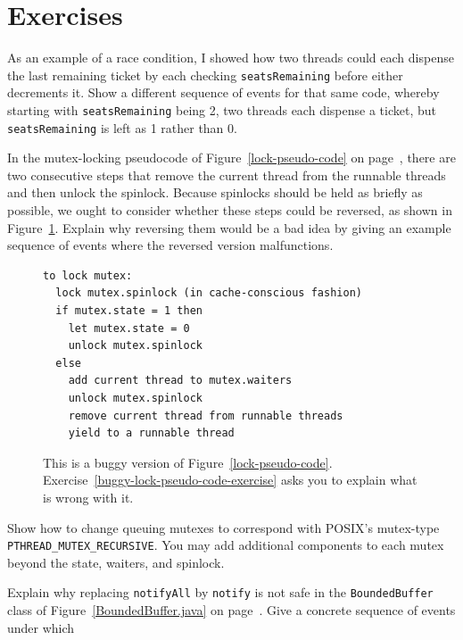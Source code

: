 \section*{Exercises}
\begin{chapterEnumerate}
\item\label{race-exercise}
As an example of a race condition, I showed how two threads could
each dispense the last remaining ticket by each checking
\verb|seatsRemaining| before either decrements it.  Show a different
sequence of events for that same code, whereby starting with
\verb|seatsRemaining| being 2, two threads each dispense a ticket, but
\verb|seatsRemaining| is left as 1 rather than 0.
\item\label{buggy-lock-pseudo-code-exercise}
In the mutex-locking pseudocode of Figure~\ref{lock-pseudo-code} on
page~\pageref{lock-pseudo-code}, there
are two consecutive steps that remove the current thread from the
runnable threads and then unlock the spinlock.  Because spinlocks should
be held as briefly as possible, we ought to consider whether these
steps could be reversed, as shown in Figure~\ref{buggy-lock-pseudo-code}.  Explain why reversing them would be a bad
idea by giving an example sequence of events where the reversed
version malfunctions.
\begin{figure}
\begin{verbatim}
to lock mutex:
  lock mutex.spinlock (in cache-conscious fashion)
  if mutex.state = 1 then
    let mutex.state = 0
    unlock mutex.spinlock
  else
    add current thread to mutex.waiters
    unlock mutex.spinlock
    remove current thread from runnable threads
    yield to a runnable thread
\end{verbatim}
\caption{This is a buggy version of Figure~\ref{lock-pseudo-code}. Exercise~\ref{buggy-lock-pseudo-code-exercise} asks you to explain what is wrong with it.}
\label{buggy-lock-pseudo-code}
\end{figure}
\item\label{recursive-mutex-exercise}
Show how to change queuing mutexes to correspond with
POSIX's mutex-type \texttt{PTHREAD\_MUTEX\_RECURSIVE}.  You may add additional
components to each mutex beyond the state, waiters, and spinlock.
\item\label{notify-exercise}
Explain why replacing \verb|notifyAll| by \verb|notify| is not safe in
the \verb|Bounded|\linebreak[0]\verb|Buffer| class of Figure~\ref{BoundedBuffer.java} on
page~\pageref{BoundedBuffer.java}.
Give a concrete sequence of events under which

\end{chapterEnumerate}
